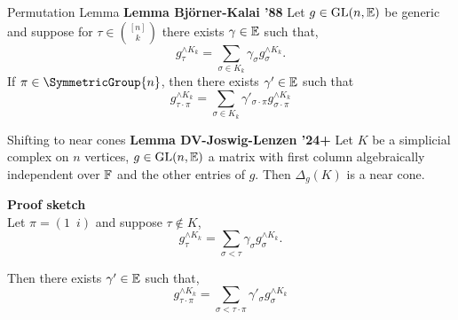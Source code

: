 \documentclass[9pt]{beamer}
\renewenvironment{lemma}[1][]
{\textcolor{LineColor}{\textbf{Lemma #1 }} }
{}
\begin{document}

\begin{frame}[fragile]{Permutation Lemma}
  \begin{lemma}[Bj\"orner-Kalai '88]
    Let $g \in \mathrm{GL}(n, {\mathbb E})$ be generic and suppose for $\tau \in \binom{[n]}{k}$ there exists    $\gamma \in {\mathbb E}$ such that,
    \[
      g^{\wedge K_k}_{\tau} = \sum_{\sigma \in K_k}\gamma_{\sigma} g^{\wedge K_k}_{\sigma}.
    \]
    If $\pi \in \SymmetricGroup{n}$, then there exists $\gamma' \in {\mathbb E}$ such that
    \[
      g^{\wedge K_k}_{\tau \cdot \pi} = \sum_{\sigma \in K_k}\gamma'_{\sigma \cdot \pi} g^{\wedge K_k}_{\sigma \cdot \pi}
    \]
  \end{lemma}

\end{frame}


\begin{frame}[fragile]{Shifting to near cones}
  \begin{lemma}[DV-Joswig-Lenzen '24+]
    Let $K$ be a simplicial complex on $n$ vertices, $g\in\mathrm{GL}(n,{\mathbb E})$  a matrix with first column algebraically independent over ${\mathbb F}$ and the other entries of $g$.
    Then $\Delta_g(K)$ is a near cone.
  \end{lemma}

  \vspace{8mm}
  \textbf{Proof sketch} \\
  Let $\pi = (1 \enspace i)$ and suppose $\tau \notin K$,
    \[
      g^{\wedge K_k}_{\tau} = \sum_{\sigma < \tau}\gamma_{\sigma} g^{\wedge K_k}_{\sigma}.
    \]

    Then there exists $\gamma' \in {\mathbb E}$ such that,
    \[
      g^{\wedge K_k}_{\tau \cdot \pi} = \sum_{\sigma < \tau \cdot \pi}\gamma'_{\sigma } g^{\wedge K_k}_{\sigma}
    \]

\end{frame}

\end{document}
